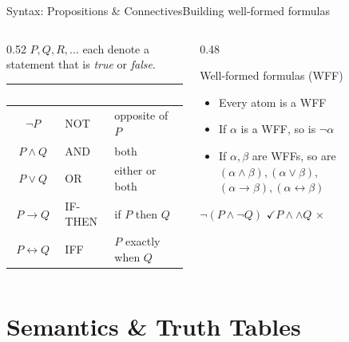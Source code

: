 \documentclass[aspectratio=169,11pt]{beamer}
\newcommand{\cmark}{\textcolor{SuccessGreen}{\ensuremath{\checkmark}}}
\newcommand{\xmark}{\textcolor{AlertRed}{\ensuremath{\times}}}
\begin{document}
\begin{frame}{Syntax: Propositions \& Connectives}{Building well-formed formulas}
  \begin{columns}[T]
    \begin{column}{0.52\textwidth}
       $P, Q, R, \dots$ each denote a statement that
      is \emph{true} or \emph{false}.
      \vspace{0.3em}
      \small
      \renewcommand{\arraystretch}{1.3}
      \begin{tabularx}{\linewidth}{@{}c l >{\raggedright\arraybackslash}X@{}}
        \toprule
        \rowcolor{PrimaryDark}
        \textcolor{white}{Symbol} & \textcolor{white}{Name} & \textcolor{white}{Meaning} \\
        \midrule
        $\neg P$ & NOT & opposite of $P$ \\
        \rowcolor{PrimaryLight!25}
        $P \land Q$ & AND & both \\
        $P \lor Q$ & OR & either or both \\
        \rowcolor{PrimaryLight!25}
        $P \rightarrow Q$ & IF-THEN & if $P$ then $Q$ \\
        $P \leftrightarrow Q$ & IFF & $P$ exactly when $Q$ \\
        \bottomrule
      \end{tabularx}
    \end{column}
    \begin{column}{0.48\textwidth}
      \begin{block}{Well-formed formulas (WFF)}
        \small
        \begin{itemize}
          \item Every atom is a WFF
          \item If $\alpha$ is a WFF, so is $\neg\alpha$
          \item If $\alpha,\beta$ are WFFs, so are
            $(\alpha \land \beta),(\alpha \lor \beta),$
            $(\alpha \rightarrow \beta),(\alpha \leftrightarrow \beta)$
        \end{itemize}
      \end{block}
      \centering\scriptsize
      $\neg(P \land \neg Q)$ \cmark \qquad $P \land \land Q$ \xmark
    \end{column}
  \end{columns}
\end{frame}

\section{Semantics \& Truth Tables}
\end{document}
